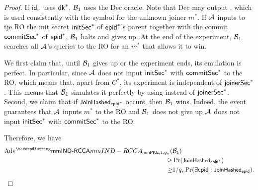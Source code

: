 \begin{proof}
  If $\id_r$ uses $\mmpkesk^*$, $\Bdv[1]$ uses the Dec oracle. Note that Dec may output , which is used consistently with the symbol for the unknown joiner $m^*$. If $\Adv$ inputs to tje RO the init secret $\initSecret^*$ of $\hgnodeid^*$'s parent together with the commit $\commitSecret^*$ of $\hgnodeid^*$, $\Bdv[1]$ halts and gives up. At the end of the experiment, $\Bdv[1]$ searches all $\Adv$'s queries to the RO for an $m^*$ that allows it to win.

  We first claim that, until $\Bdv[1]$ gives up or the experiment ends, its emulation is perfect. In particular, since $\Adv$ does not input $\initSecret^*$ with $\commitSecret^*$ to the RO, which means that, apart from $C^*$, its experiment is independent of $\joinerSecret^*$. This means that $\Bdv[1]$ simulates it perfectly by using  instead of $\joinerSecret^*$.
  Second, we claim that if $\joinerHash_{\hgnodeid^*}$ occurs, then $\Bdv[1]$ wins. Indeed, the event guarantees that $\Adv$ inputs $m^*$ to the RO and $\Bdv[1]$ does not give up
   $\Adv$ does not input $\initSecret^*$ with $\commitSecret^*$ to the RO.

  Therefore, we have
  \begin{align*}\textnormal{Adv}^\mmindrcca_{\mmPKE,1,q_n}(&\Bdv[1]) \\ \geq& \Pr(\joinerHash_{\hgnodeid^*}) \\ \geq& 1/q_e\Pr(\exists \hgnodeid : \joinerHash_{\hgnodeid}).
  \end{align*}
\end{proof}

